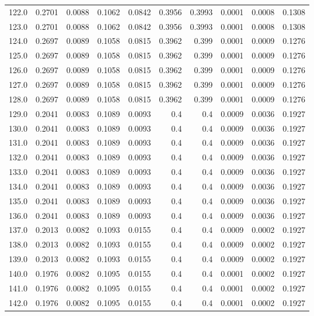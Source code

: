 \begin{longtable}{lrrrrrrrrr}
122.0 & 0.2701 & 0.0088 & 0.1062 & 0.0842 & 0.3956 & 0.3993 & 0.0001 & 0.0008 & 0.1308 \\
123.0 & 0.2701 & 0.0088 & 0.1062 & 0.0842 & 0.3956 & 0.3993 & 0.0001 & 0.0008 & 0.1308 \\
124.0 & 0.2697 & 0.0089 & 0.1058 & 0.0815 & 0.3962 & 0.399 & 0.0001 & 0.0009 & 0.1276 \\
125.0 & 0.2697 & 0.0089 & 0.1058 & 0.0815 & 0.3962 & 0.399 & 0.0001 & 0.0009 & 0.1276 \\
126.0 & 0.2697 & 0.0089 & 0.1058 & 0.0815 & 0.3962 & 0.399 & 0.0001 & 0.0009 & 0.1276 \\
127.0 & 0.2697 & 0.0089 & 0.1058 & 0.0815 & 0.3962 & 0.399 & 0.0001 & 0.0009 & 0.1276 \\
128.0 & 0.2697 & 0.0089 & 0.1058 & 0.0815 & 0.3962 & 0.399 & 0.0001 & 0.0009 & 0.1276 \\
129.0 & 0.2041 & 0.0083 & 0.1089 & 0.0093 & 0.4 & 0.4 & 0.0009 & 0.0036 & 0.1927 \\
130.0 & 0.2041 & 0.0083 & 0.1089 & 0.0093 & 0.4 & 0.4 & 0.0009 & 0.0036 & 0.1927 \\
131.0 & 0.2041 & 0.0083 & 0.1089 & 0.0093 & 0.4 & 0.4 & 0.0009 & 0.0036 & 0.1927 \\
132.0 & 0.2041 & 0.0083 & 0.1089 & 0.0093 & 0.4 & 0.4 & 0.0009 & 0.0036 & 0.1927 \\
133.0 & 0.2041 & 0.0083 & 0.1089 & 0.0093 & 0.4 & 0.4 & 0.0009 & 0.0036 & 0.1927 \\
134.0 & 0.2041 & 0.0083 & 0.1089 & 0.0093 & 0.4 & 0.4 & 0.0009 & 0.0036 & 0.1927 \\
135.0 & 0.2041 & 0.0083 & 0.1089 & 0.0093 & 0.4 & 0.4 & 0.0009 & 0.0036 & 0.1927 \\
136.0 & 0.2041 & 0.0083 & 0.1089 & 0.0093 & 0.4 & 0.4 & 0.0009 & 0.0036 & 0.1927 \\
137.0 & 0.2013 & 0.0082 & 0.1093 & 0.0155 & 0.4 & 0.4 & 0.0009 & 0.0002 & 0.1927 \\
138.0 & 0.2013 & 0.0082 & 0.1093 & 0.0155 & 0.4 & 0.4 & 0.0009 & 0.0002 & 0.1927 \\
139.0 & 0.2013 & 0.0082 & 0.1093 & 0.0155 & 0.4 & 0.4 & 0.0009 & 0.0002 & 0.1927 \\
140.0 & 0.1976 & 0.0082 & 0.1095 & 0.0155 & 0.4 & 0.4 & 0.0001 & 0.0002 & 0.1927 \\
141.0 & 0.1976 & 0.0082 & 0.1095 & 0.0155 & 0.4 & 0.4 & 0.0001 & 0.0002 & 0.1927 \\
142.0 & 0.1976 & 0.0082 & 0.1095 & 0.0155 & 0.4 & 0.4 & 0.0001 & 0.0002 & 0.1927 \\

\end{longtable}
